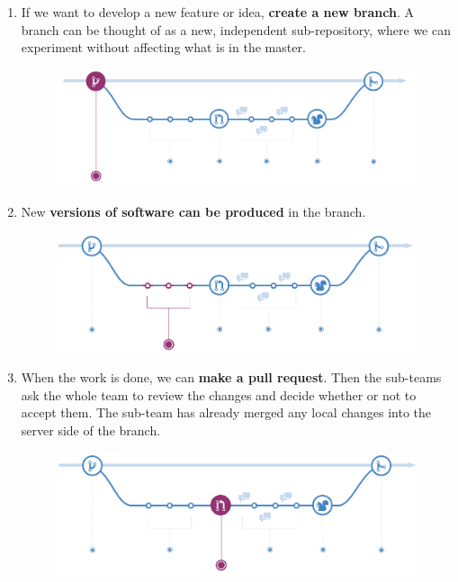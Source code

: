 \begin{enumerate}
    \item If we want to develop a new feature or idea, \textbf{create a new branch}. A branch can be thought of as a new, independent sub-repository, where we can experiment without affecting what is in the master.
    \begin{figure}[!htp]
        \centering
        \includegraphics[width=.8\textwidth]{img/git-1.png}
    \end{figure}

    \item New \textbf{versions of software can be produced} in the branch.
    \begin{figure}[!htp]
        \centering
        \includegraphics[width=.8\textwidth]{img/git-2.png}
    \end{figure}

    \item When the work is done, we can \textbf{make a pull request}. Then the sub-teams ask the whole team to review the changes and decide whether or not to accept them. The sub-team has already merged any local changes into the server side of the branch.
    \newpage
    \begin{figure}[!htp]
        \centering
        \includegraphics[width=.8\textwidth]{img/git-3.png}
    \end{figure}


\end{enumerate}
